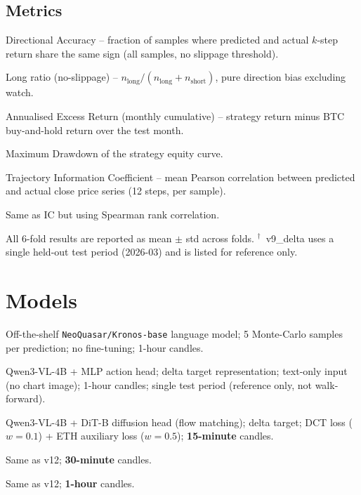 \documentclass[11pt,a4paper]{article}
\newcommand{\refmark}{$^\dagger$}
\begin{document}
\subsection{Metrics}

\begin{description}[noitemsep]
  \item[\textbf{DA}] Directional Accuracy -- fraction of samples where predicted and actual $k$-step return share the same sign (all samples, no slippage threshold).
  \item[\textbf{Long\_ns}] Long ratio (no-slippage) -- $n_{\text{long}} / (n_{\text{long}} + n_{\text{short}})$, pure direction bias excluding watch.
  \item[\textbf{AER}] Annualised Excess Return (monthly cumulative) -- strategy return minus BTC buy-and-hold return over the test month.
  \item[\textbf{MDD}] Maximum Drawdown of the strategy equity curve.
  \item[\textbf{IC}] Trajectory Information Coefficient -- mean Pearson correlation between predicted and actual close price series (12 steps, per sample).
  \item[\textbf{RankIC}] Same as IC but using Spearman rank correlation.
\end{description}

All 6-fold results are reported as mean $\pm$ std across folds.
\refmark~v9\_delta uses a single held-out test period (2026-03) and is listed for reference only.

\section{Models}

\begin{description}[noitemsep]
  \item[\textbf{Kronos}~(baseline)] Off-the-shelf \texttt{NeoQuasar/Kronos-base} language model; 5 Monte-Carlo samples per prediction; no fine-tuning; 1-hour candles.
  \item[\textbf{v9\_delta}\refmark] Qwen3-VL-4B + MLP action head; delta target representation; text-only input (no chart image); 1-hour candles; single test period (reference only, not walk-forward).
  \item[\textbf{v12 GR00T}] Qwen3-VL-4B + DiT-B diffusion head (flow matching); delta target; DCT loss ($w=0.1$) + ETH auxiliary loss ($w=0.5$); \textbf{15-minute} candles.
  \item[\textbf{v13 GR00T}] Same as v12; \textbf{30-minute} candles.
  \item[\textbf{v14 GR00T}] Same as v12; \textbf{1-hour} candles.
\end{description}
\end{document}
